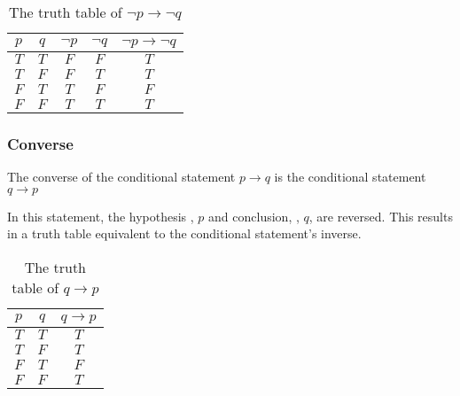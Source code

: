 \documentclass[12pt letter]{report}
\begin{document}
\begin{table}[h!]
  \caption{The truth table of $\neg p \to  \neg q$}\label{tab:7}
  \begin{center}
    \begin{tabular}{|c c|c c|c|}
      \hline
      $p$ & $q$ & $ \neg p $ & $\neg q$ & $\neg p \to  \neg q$ \\[0.5ex]
      \hline
      \hline
      $T$ & $T$ & $F$        & $F$      & $T$                  \\
      $T$ & $F$ & $F$        & $T$      & $T$                  \\
      $F$ & $T$ & $T$        & $F$      & $F$                  \\
      $F$ & $F$ & $T$        & $T$      & $T$                  \\
      \hline
    \end{tabular}
  \end{center}
\end{table}

\subsubsection{Converse}

 {
  The converse of the conditional statement $p \to q$ is the conditional statement $q \to p$
}

In this statement, the hypothesis , $p$ and conclusion, , $q$, are reversed. This results in a truth table equivalent to
the conditional statement's inverse.



\begin{table}[h!]
  \caption{The truth table of $q \to p$}\label{tab:8}
  \begin{center}
    \begin{tabular}{|c c|c|}
      \hline
      $p$ & $q$ & $q \to p$ \\[0.5ex]
      \hline
      \hline
      $T$ & $T$ & $T$       \\
      $T$ & $F$ & $T$       \\
      $F$ & $T$ & $F$       \\
      $F$ & $F$ & $T$       \\
      \hline
    \end{tabular}
  \end{center}
\end{table}
\end{document}
